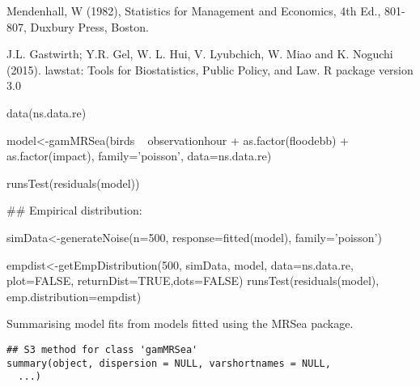 \documentclass[a4paper]{book}
\begin{document}
%
\begin{References}\relax
Mendenhall, W (1982), Statistics for Management and Economics, 4th Ed., 801-807, Duxbury Press, Boston.

J.L. Gastwirth; Y.R. Gel, W. L. Hui, V. Lyubchich, W. Miao and K. Noguchi (2015). lawstat: Tools for Biostatistics, Public Policy, and Law. R package version 3.0
\end{References}
%
\begin{Examples}
\begin{ExampleCode}

data(ns.data.re)

model<-gamMRSea(birds ~ observationhour + as.factor(floodebb) + as.factor(impact),  
              family='poisson', data=ns.data.re)

runsTest(residuals(model))

## Empirical distribution:

simData<-generateNoise(n=500, response=fitted(model), family='poisson')

empdist<-getEmpDistribution(500, simData, model, data=ns.data.re, plot=FALSE, 
                            returnDist=TRUE,dots=FALSE)
runsTest(residuals(model), emp.distribution=empdist)

\end{ExampleCode}
\end{Examples}
%
\begin{Description}\relax
Summarising model fits from models fitted using the MRSea package.
\end{Description}
%
\begin{Usage}
\begin{verbatim}
## S3 method for class 'gamMRSea'
summary(object, dispersion = NULL, varshortnames = NULL,
  ...)
\end{verbatim}
\end{Usage}
%
\end{document}
